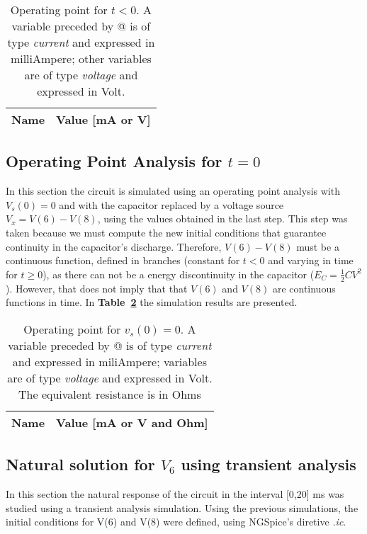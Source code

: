 \begin{table}[H]
  \centering
  \begin{tabular}{|l|r|}
    \hline    
    {\bf Name} & {\bf Value [mA or V]} \\ \hline
    
  \end{tabular}
  \vspace{10px}
  \caption{Operating point for $t<0$. A variable preceded by @ is of type {\em current}
    and expressed in milliAmpere; other variables are of type {\it voltage} and expressed in
    Volt.}
  \label{tab:op} 
\end{table}
\vspace{9cm}
\pagebreak

\subsection{Operating Point Analysis for $t=0$}
In this section the circuit is simulated using an operating point analysis with $V_s(0) = 0$ and with the capacitor replaced by a voltage source {\it $V_x=V(6)-V(8)$}, using the values obtained in the last step. This step was taken because we must compute the new initial conditions that guarantee continuity in the capacitor's discharge. Therefore, $V(6) - V(8)$ must be a continuous function, defined in branches (constant for $t<0$ and varying in time for $t \geq 0$), as there can not be a energy discontinuity in the capacitor ($E_C=\frac{1}{2}CV^{2}$). However, that does not imply that that $V(6)$ and $V(8)$ are continuous functions in time.
In \textbf{Table~\ref{tab:opeq}} the simulation results are presented. 
\begin{table}[h!]
  \centering
  \begin{tabular}{|l|r|}
    \hline    
    {\bf Name} & {\bf Value [mA or V and Ohm]} \\ \hline
    
  \end{tabular} 
  \vspace{10px}
  \caption{Operating point for {\it $v_s(0)=0$}. A variable preceded by @ is of type {\em current}
    and expressed in miliAmpere; variables are of type {\it voltage} and expressed in
    Volt. The equivalent resistance is in Ohms}
  \label{tab:opeq}
\end{table}
\vspace{6cm}
\pagebreak

\subsection{ Natural solution for $V_6$ using transient analysis}
In this section the natural response of the circuit in the interval [0,20] ms was studied using a transient analysis simulation. Using the previous simulations, the initial conditions for V(6) and V(8) were defined, using NGSpice's diretive \textit{.ic}.
\par



